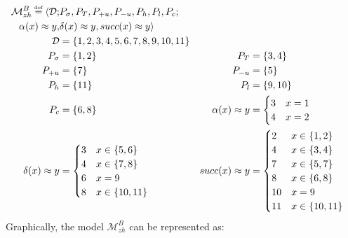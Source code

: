\documentclass{article}
\newcommand\myeq{\mathrel{\stackrel{\makebox[0pt]{\mbox{\normalfont\tiny def}}}{=}}}
\newcommand{\ap}{\approx}
\begin{document}
\begin{equation}
\begin{aligned}
\mathcal{M}^{B}_{zh} \myeq \langle \mathcal{D}; &P_{\sigma}, P_{T}, P_{+u}, P_{-u}, P_{h}, P_{l}, P_{c}; \\
\alpha(x)\ap y, &\delta(x)\ap y, succ(x)\ap y \rangle \\
\mathcal{D} &= \{1, 2, 3, 4, 5, 6, 7, 8, 9, 10, 11\}  \\
P_{\sigma} &= \{1, 2\} & P_{T} &= \{3, 4\} \\
P_{+u} &= \{7\} & P_{-u} &= \{5\} \\
P_{h} &= \{11\} & P_{l} &= \{9, 10\} \\ 
P_{c} &= \{6, 8\}& \alpha(x)\ap y &= \begin{cases} 3 & x=1 \\ 4 & x=2 \end{cases}  \\
 \delta(x)\ap y &= \begin{cases} 3 & x\in\{5,6\} \\ 4 & x\in \{7,8\} \\ 6 & x=9 \\ 8 & x\in\{10,11\} \end{cases} &
succ(x)\ap y &= \begin{cases} 2 & x\in \{1,2\} \\ 4 & x\in \{3,4\} \\ 7 & x\in\{5,7\} \\ 8 & x\in\{6,8\} \\ 10 & x=9 \\ 11 & x\in\{10,11\} \end{cases} \\
\end{aligned}
\end{equation}
Graphically, the model $\mathcal{M}^{B}_{zh}$ can be represented as:
\end{document}
